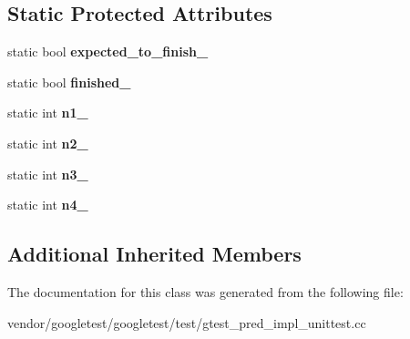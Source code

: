 \subsection*{Static Protected Attributes}
\begin{DoxyCompactItemize}
\item 
\mbox{\label{class_predicate4_test_a20600b5eda187c42ce4e812e77269654}} 
static bool {\bfseries expected\+\_\+to\+\_\+finish\+\_\+}
\item 
\mbox{\label{class_predicate4_test_acfd174bf9dfb5a91afbcdca17e797888}} 
static bool {\bfseries finished\+\_\+}
\item 
\mbox{\label{class_predicate4_test_a8eb30cd283e613f7a2e501a3969be9ae}} 
static int {\bfseries n1\+\_\+}
\item 
\mbox{\label{class_predicate4_test_a088fce743c747e3851c926cb3a87fda3}} 
static int {\bfseries n2\+\_\+}
\item 
\mbox{\label{class_predicate4_test_a00ae6ae54c7d6639d448c036aedb6114}} 
static int {\bfseries n3\+\_\+}
\item 
\mbox{\label{class_predicate4_test_ae42e23ce11e3f1c6b813496d6180cc67}} 
static int {\bfseries n4\+\_\+}
\end{DoxyCompactItemize}
\subsection*{Additional Inherited Members}


The documentation for this class was generated from the following file\+:\begin{DoxyCompactItemize}
\item 
vendor/googletest/googletest/test/gtest\+\_\+pred\+\_\+impl\+\_\+unittest.\+cc\end{DoxyCompactItemize}
